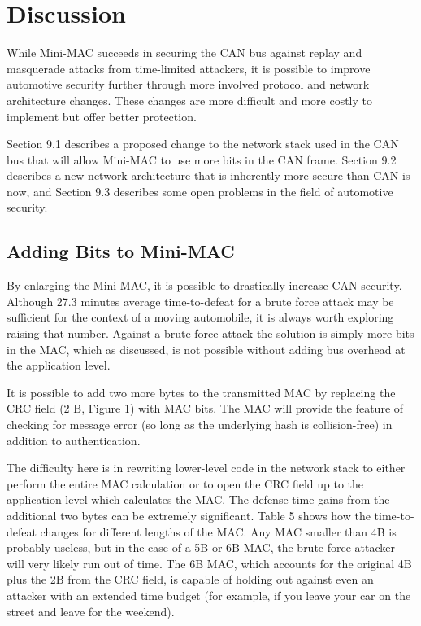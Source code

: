\section{Discussion}
While Mini-MAC succeeds in securing the CAN bus against replay and masquerade attacks from time-limited attackers, it is possible to improve automotive security further through more involved protocol and network architecture changes. These changes are more difficult and more costly to implement but offer better protection. 

Section 9.1 describes a proposed change to the network stack used in the CAN bus that will allow Mini-MAC to use more bits in the CAN frame. Section 9.2 describes a new network architecture that is inherently more secure than CAN is now, and Section 9.3 describes some open problems in the field of automotive security.

\subsection{Adding Bits to Mini-MAC}
By enlarging the Mini-MAC, it is possible to drastically increase CAN security. Although 27.3 minutes average time-to-defeat for a brute force attack may be sufficient for the context of a moving automobile, it is always worth exploring raising that number. Against a brute force attack the solution is simply more bits in the MAC, which as discussed, is not possible without adding bus overhead at the application level. 

It is possible to add two more bytes to the transmitted MAC by replacing the CRC field (2 B, Figure 1) with MAC bits. The MAC will provide the feature of checking for message error (so long as the underlying hash is collision-free) in addition to authentication.
	
The difficulty here is in rewriting lower-level code in the network stack to either perform the entire MAC calculation or to open the CRC field up to the application level which calculates the MAC. The defense time gains from the additional two bytes can be extremely significant. Table 5 shows how the time-to-defeat changes for different lengths of the MAC. Any MAC smaller than 4B is probably useless, but in the case of a 5B or 6B MAC, the brute force attacker will very likely run out of time. The 6B MAC, which accounts for the original 4B plus the 2B from the CRC field, is capable of holding out against even an attacker with an extended time budget (for example, if you leave your car on the street and leave for the weekend).

